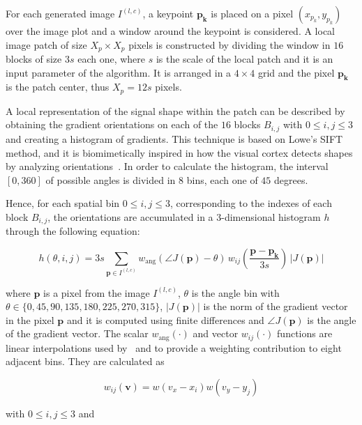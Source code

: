 \documentclass[utf8]{frontiersSCNS} %
\begin{document}
For each generated image $I^{(l,c)}$, a keypoint $\mathbf{p_k}$ is placed on a pixel $(x_{p_k}, y_{p_k})$ over the image plot and a window around the keypoint is considered. A local image patch of size $X_p \times X_p$ pixels is constructed by dividing the window in $16$ blocks of size $3s$ each one,  where $s$ is the scale of the local patch and it is an input parameter of the algorithm. It is arranged in a $4 \times 4$ grid and the pixel $ \mathbf{p_k}$ is the patch center, thus $X_p = 12s $ pixels. 

A local representation of the signal shape within the patch can be described by obtaining the gradient orientations on each of the $16$ blocks $B_{i,j}$  with $ 0 \leq i,j \leq 3$ and creating a histogram of gradients.  This technique is based on Lowe's SIFT~\citep{Lowe2004} method, and it is biomimetically inspired in how the visual cortex detects shapes by analyzing orientations~\citep{cogprints561}.   In order to calculate the histogram, the interval $[0,360]$ of possible angles is divided in $8$ bins, each one of $45$ degrees.

 Hence, for each spatial bin $ 0 \leq i,j \leq 3$, corresponding to the indexes of each block $B_{i,j}$,  the orientations are accumulated in a  $3$-dimensional histogram $h$ through the following equation: 
 

\begin{equation}
 h(\theta,i,j) = 3 s \sum_{\mathbf{p} \in I^{(l,c)}} w_\mathrm{ang}(\angle J(\mathbf{p}) - \theta)\, w_{ij}\left(\frac{\mathbf{p} - \mathbf{p_k}}{3 s}\right)\, |J(\mathbf{p})|
\label{eq:histogram}
\end{equation}

\noindent  where $\mathbf{p}$ is a pixel from the image $I^{(l,c)}$,  $\theta$ is the angle bin with $ \theta \in \{0, 45, 90, 135, 180, 225, 270, 315\} $,  $ |J(\mathbf{p})| $ is the norm of the gradient vector in the pixel $\mathbf{p}$ and it is computed using finite differences and $\angle J(\mathbf{p}) $ is the angle of the gradient vector.  The scalar $ w_\mathrm{ang}(\cdot) $  and vector $ w_{ij}(\cdot) $ functions are linear interpolations used by~\cite{Lowe2004} and \cite{Vedaldi2010} to provide a weighting contribution to eight adjacent bins.  They are calculated as  

\begin{equation}
 w_{ij}(\mathbf{v}) = w( v_x - x_i ) w( v_y - y_j ) 
\label{eq:ij}
\end{equation}

\noindent with $ 0 \leq i,j \leq 3$ and
\end{document}
